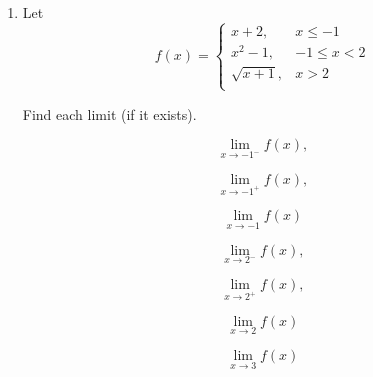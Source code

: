 \documentclass{exam}
\begin{document}
\begin{enumerate}
\vfill
\vfill

\item
Let 
\[   f(x)=\left\{
\begin{array}{ll}
      x+2, & x\leq -1 \\
      x^{2}-1,& -1\leq x < 2\\
      \sqrt{x+1},   & x>2 \\
\end{array} 
\right. \]

Find each limit (if it exists).

\begin{minipage}{.3\linewidth}
\begin{equation*}
 \lim_{x\to -1^{-}}f(x),
\end{equation*}
\end{minipage}%
\begin{minipage}{.3\linewidth}
\begin{equation*}
 \lim_{x\to -1^{+}}f(x),
\end{equation*}
\end{minipage}%
\begin{minipage}{.3\linewidth}
\begin{equation*}
 \lim_{x\to -1}f(x)
\end{equation*}
\end{minipage}


\vfill

\begin{minipage}{.3\linewidth}
\begin{equation*}
 \lim_{x\to 2^{-}}f(x),
\end{equation*}
\end{minipage}%
\begin{minipage}{.2\linewidth}
\begin{equation*}
 \lim_{x\to 2^{+}}f(x),
\end{equation*}
\end{minipage}%
\begin{minipage}{.2\linewidth}
\begin{equation*}
 \lim_{x\to 2}f(x)
\end{equation*}
\end{minipage}
\begin{minipage}{.2\linewidth}
\begin{equation*}
 \lim_{x\to 3}f(x)
\end{equation*}
\end{minipage}
\vfill

\newpage




\end{enumerate}
\end{document}
